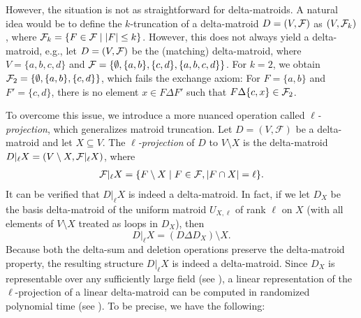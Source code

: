 However, the situation is not as straightforward for delta-matroids.
A natural idea would be to define the $k$-truncation of a delta-matroid $D = (V, \mathcal F)$ as $(V, \mathcal F_k)$, where $\mathcal F_k = \{ F \in \mathcal F \mid |F| \le k\}$.
However, this does not always yield a delta-matroid, e.g., let $D = (V, \mathcal F)$ be the (matching) delta-matroid, where $V = \{ a, b, c, d \}$ and $\mathcal F = \{ \emptyset, \{ a, b \}, \{ c, d \}, \{ a, b, c, d \} \}$.
For $k = 2$, we obtain $\mathcal F_2 = \{ \emptyset, \{ a, b \}, \{ c, d \} \}$, which fails the exchange axiom:
For $F = \{ a, b \}$ and $F' = \{ c, d \}$, there is no element $x \in F \Delta F'$ such that ${F \Delta \{ c, x \} \in \mathcal F_2}$.

To overcome this issue, we introduce a more nuanced operation called \emph{$\ell$-projection}, which generalizes matroid truncation.
Let $D = (V, \mathcal{F})$ be a delta-matroid and let $X \subseteq V$.  
The \emph{$\ell$-projection} of $D$ to $V \setminus X$ is the delta-matroid $D |_{\ell} X = (V \setminus X, \mathcal F |_{\ell} X)$, where
\begin{align*}
  \mathcal F |_{\ell} X = \{ F \setminus X \mid F \in \mathcal F, |F \cap X| = \ell \}.
\end{align*}
It can be verified that $D|_\ell X$ is indeed a delta-matroid. 
In fact, if we let $D_X$ be the basis delta-matroid of the uniform matroid $U_{X,\ell}$ of rank $\ell$ on $X$ (with all elements of $V \setminus X$ treated as loops in $D_X$), then
\[
  D |_\ell X = (D \Delta D_X) \setminus X.
\]
Because both the delta-sum and deletion operations preserve the delta-matroid property, the resulting structure $D |_\ell X$ is indeed a delta-matroid.
Since $D_X$ is representable over any sufficiently large field (see \cite{OxleyBook2}), a linear representation of the $\ell$-projection of a linear delta-matroid can be computed in randomized polynomial time (see \cite{KW24}).  
To be precise, we have the following:

